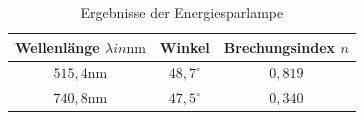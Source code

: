 \documentclass[11pt, a4paper]{article}
\begin{document}

    \begin{table}[h]
        \centering
        \begin{tabular}{c|c|c}
            Wellenlänge $\lambda in \si{\nano\metre}$ & Winkel & Brechungsindex $n$ \\ \hline
            $515,4 \si{\nano\meter}$ & $48,7^{\circ}$ & $0,819$ \\ \hline
            $740,8 \si{\nano\meter}$ & $47,5^{\circ}$ & $0,340$ \\ \hline
        \end{tabular}
        \caption{Ergebnisse der Energiesparlampe}
        \label{tab:energiesparlampe}
    \end{table}

    
    
\end{document}
